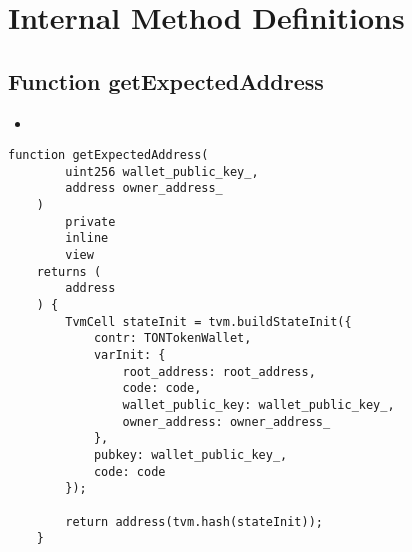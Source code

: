 \section{Internal Method Definitions}

\subsection{Function getExpectedAddress}

\begin{itemize}
\item \issueInternal
\end{itemize}

\begin{lstlisting}[firstnumber=620]
    function getExpectedAddress(
        uint256 wallet_public_key_,
        address owner_address_
    )
        private
        inline
        view
    returns (
        address
    ) {
        TvmCell stateInit = tvm.buildStateInit({
            contr: TONTokenWallet,
            varInit: {
                root_address: root_address,
                code: code,
                wallet_public_key: wallet_public_key_,
                owner_address: owner_address_
            },
            pubkey: wallet_public_key_,
            code: code
        });

        return address(tvm.hash(stateInit));
    }
\end{lstlisting}
